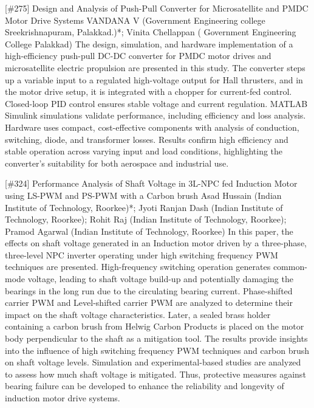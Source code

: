 {} \begin{abstract_online} {[\#275] Design and Analysis of Push-Pull Converter for  Microsatellite and PMDC Motor Drive Systems} {} {VANDANA  V (Government Engineering college Sreekrishnapuram, Palakkad.)*; Vinita Chellappan ( Government Engineering College Palakkad)} {} The design, simulation, and hardware implementation of a high-efficiency push-pull DC-DC converter for PMDC motor drives and microsatellite electric propulsion are presented in this study. The converter steps up a variable input to a regulated high-voltage output for Hall thrusters, and in the motor drive setup, it is integrated with a chopper for current-fed control. Closed-loop PID control ensures stable voltage and current regulation. MATLAB Simulink simulations validate performance, including efficiency and loss analysis. Hardware uses compact, cost-effective components with analysis of conduction, switching, diode, and transformer losses. Results confirm high efficiency and stable operation across varying input and load conditions, highlighting the converter's suitability for both aerospace and industrial use. \end{abstract_online} 
{} \begin{abstract_online} {[\#324] Performance Analysis of Shaft Voltage in 3L-NPC fed Induction Motor using LS-PWM and PS-PWM with a Carbon brush} {} {Asad Hussain (Indian Institute of Technology, Roorkee)*; Jyoti Ranjan Dash (Indian Institute of Technology, Roorkee); Rohit Raj (Indian Institute of Technology, Roorkee); Pramod Agarwal (Indian Institute of Technology, Roorkee)} {} In this paper, the effects on shaft voltage generated in an Induction motor driven by a three-phase, three-level NPC inverter operating under high switching frequency PWM techniques are presented. High-frequency switching operation generates common-mode voltage, leading to shaft voltage build-up and potentially damaging the bearings in the long run due to the circulating bearing current. Phase-shifted carrier PWM and Level-shifted carrier PWM are analyzed to determine their impact on the shaft voltage characteristics. Later, a sealed brass holder containing a carbon brush from Helwig Carbon Products is placed on the motor body perpendicular to the shaft as a mitigation tool. The results provide insights into the influence of high switching frequency PWM techniques and carbon brush on shaft voltage levels. Simulation and experimental-based studies are analyzed to assess how much shaft voltage is mitigated. Thus, protective measures against bearing failure can be developed to enhance the reliability and longevity of induction motor drive systems. \end{abstract_online} 
